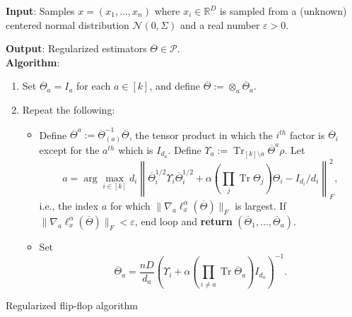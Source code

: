 \documentclass[aos]{imsart}
\theoremstyle{definition}
\numberwithin{equation}{section}
\DeclareMathOperator{\tr}{Tr}
\DeclarePairedDelimiter{\norm}{\lVert}{\rVert}
\newcommand{\R}{{\mathbb{R}}}
\newcommand{\otheta}{\overline{\Theta}}
\newcommand{\ot}{\otimes}
\newcommand{\eps}{\varepsilon}
\newcommand{\cN}{\mathcal{N}}
\newcommand{\SPD}{\mathcal{P}}
\newcommand{\samp}{x}
\begin{document}
\begin{Algorithm}
\textbf{Input}: Samples $\samp = (\samp_1, \ldots, \samp_n)$ where $\samp_i \in \R^D$ is sampled from a (unknown) centered normal distribution $\cN(0, \Sigma)$ and a real number $\eps > 0$.

\textbf{Output}: Regularized estimators $\otheta \in \SPD$.\\[.1ex]

\textbf{Algorithm}:
\begin{enumerate}
\item\label{it:flip-flop step 1} Set $\otheta_a = I_a$ for each $a \in [k]$, and define $\otheta:= \otimes_a \otheta_a$.
\item\label{it:flip-flop step 2} Repeat the following:
\begin{itemize}
\item Define $\otheta^a:= \otheta_{(a)}^{-1} \otheta$, the tensor product in which the $i^{th}$ factor is $\otheta_i$ except for the $a^{th}$ which is $I_{d_a}$. Define $\Upsilon_a :=\tr_{[k] \setminus a} \otheta^a \rho$. Let $$a = \arg\max_{i \in [k]} d_i   \left\| \otheta_i^{1/2} \Upsilon_i \otheta_i^{1/2}  + \alpha (\prod_j \tr \Theta_j) \Theta_i - I_{d_i}/d_i\right\|_F^2,$$
i.e., the index $a$ for which $\|\nabla_a \ell^\alpha_{\samp}(\otheta)\|_F$ is largest. If $\|\nabla_a \ell^\alpha_\samp(\otheta)\|_F < \eps$, end loop and \textbf{return} $(\otheta_1, \dots, \otheta_a)$.
\item Set
$$\otheta_a = \frac{n D}{d_a}\left(\Upsilon_i + \alpha \left(\prod_{i \neq a} \tr \otheta_a\right) I_{d_a} \right)^{-1}.$$
\end{itemize}
\end{enumerate}
\caption{Regularized flip-flop algorithm}\label{alg:reg-flip-flop}
\end{Algorithm}
\end{document}
